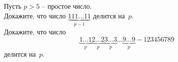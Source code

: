 \begin{problems}
\item
Пусть $p > 5$ -- простое число.
\\
\subproblem
Докажите, что число $\underbrace{111 \ldots 11}_{p - 1}$ делится на~$p$.
\\
\subproblem
Докажите, что число
\[
    \underbrace{1 \ldots 1}_{p}
    \underbrace{2 \ldots 2}_{p}
    \underbrace{3 \ldots 3}_{p}
    \ldots
    \underbrace{9 \ldots 9}_{p}
    - 123456789
\]
делится на~$p.$


\end{problems}

